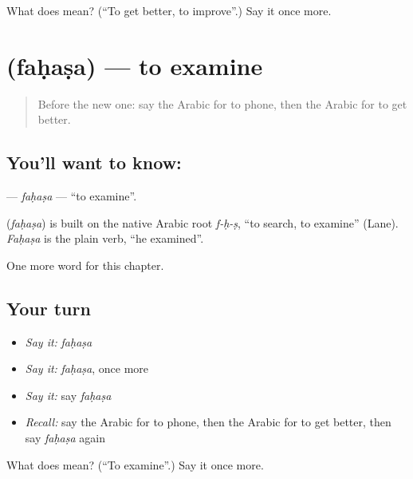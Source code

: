 \begin{tcolorbox}[breakable,colback=teal!4,colframe=teal!35!black,title={Before you move on}]
What does  mean? (\textquotedblleft{}To get better, to improve\textquotedblright{}.) Say it once more.
\end{tcolorbox}
\section[\texorpdfstring{\ar{فحص} (faḥaṣa)}{فحص (faḥaṣa)}]{ (faḥaṣa) — to examine}

\label{lesson:AR-C255-fahasa}



\begin{quote}
Before the new one: say the Arabic for to phone, then the Arabic for to get better.
\end{quote}

\subsection*{You'll want to know: }
\textbf{} — \emph{faḥaṣa} — \textquotedblleft{}to examine\textquotedblright{}.

\begin{cousinweb}
\textbf{} (\emph{faḥaṣa}) is built on the native Arabic root \emph{f-ḥ-ṣ}, \textquotedblleft{}to search, to examine\textquotedblright{} (Lane). \emph{Faḥaṣa} is the plain verb, \textquotedblleft{}he examined\textquotedblright{}.
\end{cousinweb}

\begin{grammarlens}[title={What you've built}]
One more word for this chapter.
\end{grammarlens}

\subsection*{Your turn}
\begin{itemize}
\raggedright
  \item \emph{Say it:} \emph{faḥaṣa}
  \item \emph{Say it:} \emph{faḥaṣa}, once more
  \item \emph{Say it:} say \emph{faḥaṣa}
  \item \emph{Recall:} say the Arabic for to phone, then the Arabic for to get better, then say \emph{faḥaṣa} again
\end{itemize}

\begin{tcolorbox}[breakable,colback=teal!4,colframe=teal!35!black,title={Before you move on}]
What does  mean? (\textquotedblleft{}To examine\textquotedblright{}.) Say it once more.
\end{tcolorbox}
